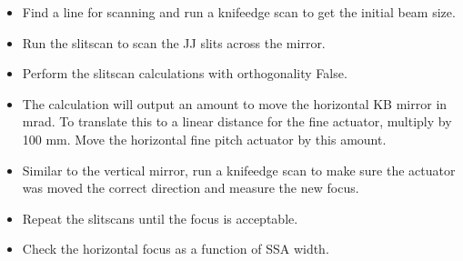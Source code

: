 \documentclass[letterpaper,10pt,english]{sphinxmanual}
\begin{document}
\begin{itemize}
\begin{description}
\begin{enumerate}
\begin{description}
\begin{itemize}
\item {} 
\sphinxAtStartPar
Find a line for scanning and run a knife\sphinxhyphen{}edge scan to get the initial beam size.

\item {} 
\sphinxAtStartPar
Run the slit\sphinxhyphen{}scan to scan the JJ slits across the mirror.

\item {} 
\sphinxAtStartPar
Perform the slit\sphinxhyphen{}scan calculations with orthogonality False.

\item {} 
\sphinxAtStartPar
The calculation will output an amount to move the horizontal K\sphinxhyphen{}B mirror in mrad. To translate this to a linear distance for the fine actuator, multiply by 100 mm. Move the horizontal fine pitch actuator by this amount.

\item {} 
\sphinxAtStartPar
Similar to the vertical mirror, run a knife\sphinxhyphen{}edge scan to make sure the actuator was moved the correct direction and measure the new focus.

\item {} 
\sphinxAtStartPar
Repeat the slit\sphinxhyphen{}scans until the focus is acceptable.

\item {} 
\sphinxAtStartPar
Check the horizontal focus as a function of SSA width.

\end{itemize}

\end{description}

\end{enumerate}

\end{description}

\end{itemize}
\end{document}
